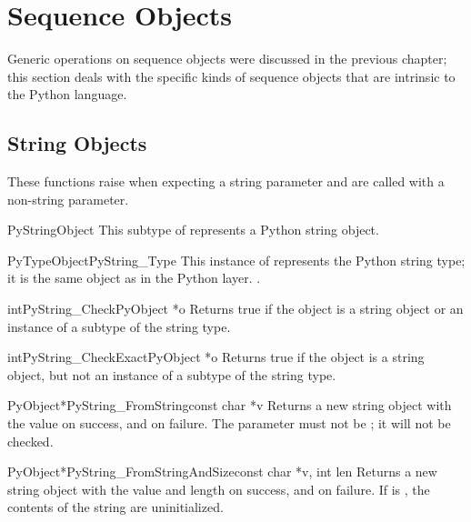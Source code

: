 \section{Sequence Objects \label{sequenceObjects}}

Generic operations on sequence objects were discussed in the previous
chapter; this section deals with the specific kinds of sequence
objects that are intrinsic to the Python language.


\subsection{String Objects \label{stringObjects}}

These functions raise  when expecting a string
parameter and are called with a non-string parameter.

\begin{ctypedesc}{PyStringObject}
  This subtype of  represents a Python string object.
\end{ctypedesc}

\begin{cvardesc}{PyTypeObject}{PyString_Type}
  This instance of  represents the Python string
  type; it is the same object as  in the Python
  layer.
  .
\end{cvardesc}

\begin{cfuncdesc}{int}{PyString_Check}{PyObject *o}
  Returns true if the object  is a string object or an instance
  of a subtype of the string type.
\end{cfuncdesc}

\begin{cfuncdesc}{int}{PyString_CheckExact}{PyObject *o}
  Returns true if the object  is a string object, but not an
  instance of a subtype of the string type.
\end{cfuncdesc}

\begin{cfuncdesc}{PyObject*}{PyString_FromString}{const char *v}
  Returns a new string object with the value  on success, and
  \NULL{} on failure.  The parameter  must not be \NULL; it
  will not be checked.
\end{cfuncdesc}

\begin{cfuncdesc}{PyObject*}{PyString_FromStringAndSize}{const char *v,
                                                         int len}
  Returns a new string object with the value  and length
   on success, and \NULL{} on failure.  If  is
  \NULL, the contents of the string are uninitialized.
\end{cfuncdesc}

